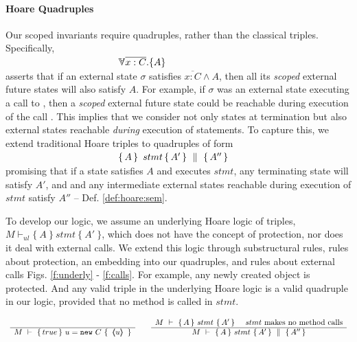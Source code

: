 \paragraph{Hoare Quadruples} Our scoped invariants require quadruples, rather than the classical triples.
Specifically, \\
  $\strut \ \hspace{4cm} {\TwoStatesN  {\overline{x:C}}  {A}}$\\
 asserts that if an external {state} $\sigma$ 
 satisfies  $\overline {x:C} \wedge A$, then all its \emph{scoped} external future  states will   also  satisfy  $A$. 
For example, if $\sigma$ was an external state executing a call to , then a \emph{scoped} external future  state
 could be reachable during execution of the   call .
This implies that we consider not only states at termination but also external states reachable
 \emph{during} execution of  statements. 
To  capture this, we extend   traditional Hoare triples to quadruples of  form\\
 $\strut \ \hspace{4cm} \quadruple {A} {\, stmt\, }{A'} {A''}$\\  
 promising that if a state satisfies $A$ and executes $stmt$, any terminating state will satisfy $A'$, and 
 and  any intermediate external states reachable during execution of $stmt$ satisfy    $A''$ -- \cf Def. \ref{def:hoare:sem}.
 
\vspace{.1cm}

To develop our logic, we   assume  an  underlying   Hoare logic  of  triples, 
$ M \vdash_{ul} \{ \ A\ \} {\ stmt\ }\{\ A'\ \} $,
which does not {have} the concept of protection, nor does it deal with external calls.
We extend this logic through  
substructural rules,   rules about protection,  an embedding into our quadruples, and rules about external calls
\cf Figs. \ref{f:underly} -  \ref{f:calls}.
%
For example, any newly created object is protected. And any %
valid triple in the underlying Hoare logic is a valid quadruple in our logic, provided that no method is called in $stmt$.


\small
$
\begin{array}{lcl}
\inferruleNoName 
	{ 
	 	
	}  	 
	{	 
 	\hproves  {M}  
	                {  true  }  
 			   {\  u = \prg{new}\ C \ }
 			   {\  \inside{u}\  } 
	} 
	& &
\inferruleNoName 
	{  
	\hproves{M}  {A} {\ stmt \ } {A'} \ \ \ \ stmt\  \mbox{makes no method calls}
	}
	{\hprovesN{M}  {A} {\ stmt \ } {A'} {A''} }
\end{array}
$
\normalsize

